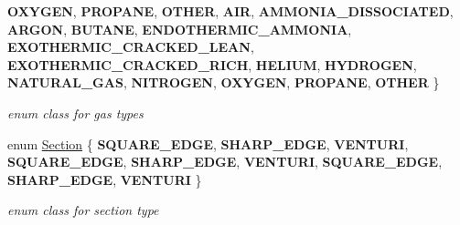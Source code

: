 \begin{DoxyCompactItemize}
{\bfseries O\+X\+Y\+G\+EN}, 
{\bfseries P\+R\+O\+P\+A\+NE}, 
{\bfseries O\+T\+H\+ER}, 
\newline
{\bfseries A\+IR}, 
{\bfseries A\+M\+M\+O\+N\+I\+A\+\_\+\+D\+I\+S\+S\+O\+C\+I\+A\+T\+ED}, 
{\bfseries A\+R\+G\+ON}, 
{\bfseries B\+U\+T\+A\+NE}, 
\newline
{\bfseries E\+N\+D\+O\+T\+H\+E\+R\+M\+I\+C\+\_\+\+A\+M\+M\+O\+N\+IA}, 
{\bfseries E\+X\+O\+T\+H\+E\+R\+M\+I\+C\+\_\+\+C\+R\+A\+C\+K\+E\+D\+\_\+\+L\+E\+AN}, 
{\bfseries E\+X\+O\+T\+H\+E\+R\+M\+I\+C\+\_\+\+C\+R\+A\+C\+K\+E\+D\+\_\+\+R\+I\+CH}, 
{\bfseries H\+E\+L\+I\+UM}, 
\newline
{\bfseries H\+Y\+D\+R\+O\+G\+EN}, 
{\bfseries N\+A\+T\+U\+R\+A\+L\+\_\+\+G\+AS}, 
{\bfseries N\+I\+T\+R\+O\+G\+EN}, 
{\bfseries O\+X\+Y\+G\+EN}, 
\newline
{\bfseries P\+R\+O\+P\+A\+NE}, 
{\bfseries O\+T\+H\+ER}
 \}\begin{DoxyCompactList}\small\item\em enum class for gas types \end{DoxyCompactList}
\item 
\mbox{\label{class_flow_calculations_energy_use_afbabab0da698748de91369a5dfc7662a}} 
enum \hyperlink{class_flow_calculations_energy_use_afbabab0da698748de91369a5dfc7662a}{Section} \{ \newline
{\bfseries S\+Q\+U\+A\+R\+E\+\_\+\+E\+D\+GE}, 
{\bfseries S\+H\+A\+R\+P\+\_\+\+E\+D\+GE}, 
{\bfseries V\+E\+N\+T\+U\+RI}, 
{\bfseries S\+Q\+U\+A\+R\+E\+\_\+\+E\+D\+GE}, 
\newline
{\bfseries S\+H\+A\+R\+P\+\_\+\+E\+D\+GE}, 
{\bfseries V\+E\+N\+T\+U\+RI}, 
{\bfseries S\+Q\+U\+A\+R\+E\+\_\+\+E\+D\+GE}, 
{\bfseries S\+H\+A\+R\+P\+\_\+\+E\+D\+GE}, 
\newline
{\bfseries V\+E\+N\+T\+U\+RI}
 \}\begin{DoxyCompactList}\small\item\em enum class for section type \end{DoxyCompactList}
\end{DoxyCompactItemize}

